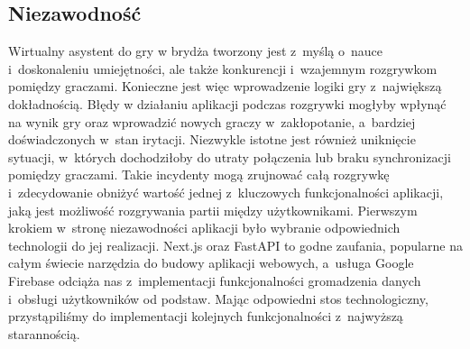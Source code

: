 \subsection{Niezawodność}
Wirtualny asystent do gry w brydża tworzony jest z~myślą o~nauce
i~doskonaleniu umiejętności, ale także konkurencji i~wzajemnym
rozgrywkom pomiędzy graczami. Konieczne jest więc wprowadzenie logiki
gry z~największą dokładnością. Błędy w działaniu aplikacji podczas
rozgrywki mogłyby wpłynąć na wynik gry oraz wprowadzić nowych graczy
w~zakłopotanie, a~bardziej doświadczonych w~stan irytacji.
Niezwykle istotne jest również uniknięcie sytuacji, w~których
dochodziłoby do utraty połączenia lub braku synchronizacji pomiędzy
graczami. Takie incydenty mogą zrujnować całą rozgrywkę i~zdecydowanie
obniżyć wartość jednej z~kluczowych funkcjonalności aplikacji, jaką
jest możliwość rozgrywania partii między użytkownikami.
Pierwszym krokiem w~stronę niezawodności aplikacji było wybranie
odpowiednich technologii do jej realizacji. Next.js oraz FastAPI %
to godne zaufania, popularne na całym świecie narzędzia do budowy
aplikacji webowych, a~usługa Google Firebase odciąża nas z~implementacji
funkcjonalności gromadzenia danych i~obsługi użytkowników od podstaw.
Mając odpowiedni stos technologiczny, przystąpiliśmy do implementacji
kolejnych funkcjonalności z~najwyższą starannością.

